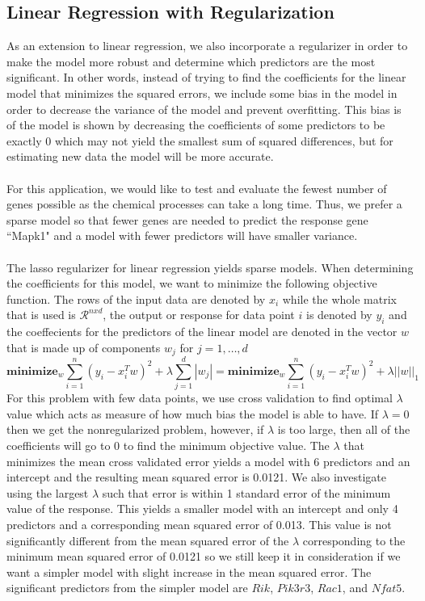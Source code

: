 \documentclass{article}
\begin{document}
\subsection{Linear Regression with Regularization}
As an extension to linear regression, we also incorporate a regularizer in order to make the model more robust and determine which predictors are the most significant.  In other words, instead of trying to find the coefficients for the linear model that minimizes the squared errors, we include some bias in the model in order to decrease the variance of the model and prevent overfitting.  This bias is of the model is shown by decreasing the coefficients of some predictors to be exactly $0$ which may not yield the smallest sum of squared differences, but for estimating new data the model will be more accurate. \\
\null\\
For this application, we would like to test and evaluate the fewest number of genes possible as the chemical processes can take a long time.  Thus, we prefer a sparse model so that fewer genes are needed to predict the response gene ``Mapk1" and a model with fewer predictors will have smaller variance.\\
\null\\
The lasso regularizer for linear regression yields sparse models.  When determining the coefficients for this model, we want to minimize the following objective function.  The rows of the input data are denoted by $x_i$ while the whole matrix that is used is $\mathcal{R}^{nxd}$, the output or response for data point $i$ is denoted by $y_i$ and the coeffecients for the predictors of the linear model are denoted in the vector $w$ that is made up of components $w_j$ for $j=1,\dots,d$
\begin{equation}
	\textbf{minimize}_w \sum_{i=1}^n(y_i-x_i^Tw)^2+\lambda\sum_{j=1}^d |w_j| = \textbf{minimize}_w \sum_{i=1}^n(y_i-x_i^Tw)^2+\lambda||w||_1
\end{equation}
For this problem with few data points, we use cross validation to find optimal $\lambda$ value which acts as measure of how much bias the model is able to have.  If $\lambda = 0$ then we get the nonregularized problem, however, if $\lambda$ is too large, then all of the coefficients will go to $0$ to find the minimum objective value.  The $\lambda$ that minimizes the mean cross validated error yields a model with 6 predictors and an intercept and the resulting mean squared error is 0.0121.  We also investigate using the largest $\lambda$ such that error is within 1 standard error of the minimum value of the response.  This yields a smaller model with an intercept and only 4 predictors and a corresponding mean squared error of 0.013. This value is not significantly different from the mean squared error of the $\lambda$ corresponding to the minimum mean squared error of 0.0121 so we still keep it in consideration if we want a simpler model with slight increase in the mean squared error.  The significant predictors from the simpler model are $Rik$, $Pik3r3$, $Rac1$, and $Nfat5$.  
\end{document}
